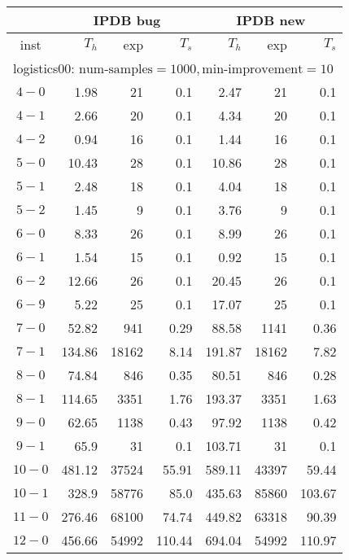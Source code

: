 \begin{longtable}{|c||r|r|r||r|r|r|}\firsthline
& \multicolumn{3}{c||}{IPDB bug} & \multicolumn{3}{c||}{IPDB new}\\\hline
inst & $T_h$ & exp & $T_s$ & $T_h$ & exp & $T_s$\\\hline
\multicolumn{7}{|l|}{logistics00: $\text{num-samples}=1000,\text{min-improvement}=10$}\\\hline
$4-0$ & 1.98 & 21 & 0.1 &2.47 & 21 & 0.1 \\\hline
$4-1$ & 2.66 & 20 & 0.1 &4.34 & 20 & 0.1 \\\hline
$4-2$ & 0.94 & 16 & 0.1 &1.44 & 16 & 0.1 \\\hline
$5-0$ & 10.43 & 28 & 0.1 &10.86 & 28 & 0.1 \\\hline
$5-1$ & 2.48 & 18 & 0.1 &4.04 & 18 & 0.1 \\\hline
$5-2$ & 1.45 & 9 & 0.1 &3.76 & 9 & 0.1 \\\hline
$6-0$ & 8.33 & 26 & 0.1 &8.99 & 26 & 0.1 \\\hline
$6-1$ & 1.54 & 15 & 0.1 &0.92 & 15 & 0.1 \\\hline
$6-2$ & 12.66 & 26 & 0.1 &20.45 & 26 & 0.1 \\\hline
$6-9$ & 5.22 & 25 & 0.1 &17.07 & 25 & 0.1 \\\hline
$7-0$ & 52.82 & 941 & 0.29 &88.58 & 1141 & 0.36 \\\hline
$7-1$ & 134.86 & 18162 & 8.14 &191.87 & 18162 & 7.82 \\\hline
$8-0$ & 74.84 & 846 & 0.35 &80.51 & 846 & 0.28 \\\hline
$8-1$ & 114.65 & 3351 & 1.76 &193.37 & 3351 & 1.63 \\\hline
$9-0$ & 62.65 & 1138 & 0.43 &97.92 & 1138 & 0.42 \\\hline
$9-1$ & 65.9 & 31 & 0.1 &103.71 & 31 & 0.1 \\\hline
$10-0$ & 481.12 & 37524 & 55.91 &589.11 & 43397 & 59.44 \\\hline
$10-1$ & 328.9 & 58776 & 85.0 &435.63 & 85860 & 103.67 \\\hline
$11-0$ & 276.46 & 68100 & 74.74 &449.82 & 63318 & 90.39 \\\hline
$12-0$ & 456.66 & 54992 & 110.44 &694.04 & 54992 & 110.97 \\\hline


\end{longtable}
